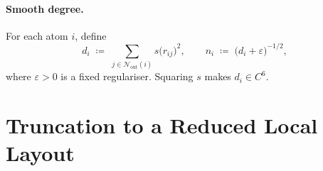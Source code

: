 \documentclass[11pt,a4paper]{article}
\newcommand{\Nb}{\mathcal{N}}
\theoremstyle{plain}
\theoremstyle{definition}
\theoremstyle{remark}
\begin{document}
\paragraph{Smooth degree.}
For each atom $i$, define
\begin{equation}\label{eq:deg}
    d_i \;\coloneqq\; \sum_{j\in\Nb_{\mathrm{out}}(i)} s\bigl(r_{ij}\bigr)^2,
    \qquad
    n_i \;\coloneqq\; \bigl(d_i+\varepsilon\bigr)^{-1/2},
\end{equation}
where $\varepsilon>0$ is a fixed regulariser.
Squaring $s$ makes $d_i\in C^6$.

\section{Truncation to a Reduced Local Layout}\label{sec:trunc}
\end{document}
